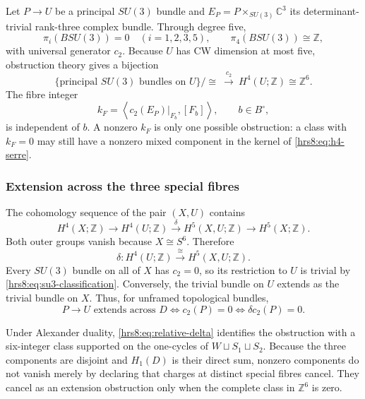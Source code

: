 Let $P\to U$ be a principal $SU(3)$ bundle and
$E_P=P\times_{SU(3)}\mathbb C^3$ its determinant-trivial rank-three complex
bundle.  Through degree five,
\[
 \pi_i(BSU(3))=0\quad(i=1,2,3,5),
 \qquad \pi_4(BSU(3))\cong\mathbb Z,
\]
with universal generator $c_2$.  Because $U$ has CW dimension at most five,
obstruction theory gives a bijection
\begin{equation}
 \boxed{
 \{\text{principal }SU(3)\text{ bundles on }U\}/\!\cong
 \ \xrightarrow{\ c_2\ }\ H^4(U;\mathbb Z)\cong\mathbb Z^6.}
 \label{hrs8:eq:su3-classification}
\end{equation}
The fibre integer
\begin{equation}
 k_F=\left\langle c_2(E_P)|_{F_b},[F_b]\right\rangle,
 \qquad b\in B^\circ,
 \label{hrs8:eq:fibre-instanton-number}
\end{equation}
is independent of $b$.  A nonzero $k_F$ is only one possible obstruction: a
class with $k_F=0$ may still have a nonzero mixed component in the kernel of
\eqref{hrs8:eq:h4-serre}.

\subsubsection{Extension across the three special fibres}
\label{hrs8:subsubsec:extension}

The cohomology sequence of the pair $(X,U)$ contains
\[
 H^4(X;\mathbb Z)\longrightarrow H^4(U;\mathbb Z)
 \xrightarrow{\delta}H^5(X,U;\mathbb Z)
 \longrightarrow H^5(X;\mathbb Z).
\]
Both outer groups vanish because $X\cong S^6$.  Therefore
\begin{equation}
 \boxed{\delta\colon H^4(U;\mathbb Z)
 \xrightarrow{\ \cong\ }H^5(X,U;\mathbb Z).}
 \label{hrs8:eq:relative-delta}
\end{equation}
Every $SU(3)$ bundle on all of $X$ has $c_2=0$, so its restriction to $U$ is
trivial by \eqref{hrs8:eq:su3-classification}.  Conversely, the trivial
bundle on $U$ extends as the trivial bundle on $X$.  Thus, for unframed
topological bundles,
\begin{equation}
 \boxed{P\to U\text{ extends across }D
 \iff c_2(P)=0
 \iff\delta c_2(P)=0.}
 \label{hrs8:eq:extension-criterion}
\end{equation}

Under Alexander duality, \eqref{hrs8:eq:relative-delta} identifies the
obstruction with a six-integer class supported on the one-cycles of
$W\sqcup S_1\sqcup S_2$.  Because the three components are disjoint and
$H_1(D)$ is their direct sum, nonzero components do not vanish merely by
declaring that charges at distinct special fibres cancel.  They cancel as an
extension obstruction only when the complete class in $\mathbb Z^6$ is zero.

